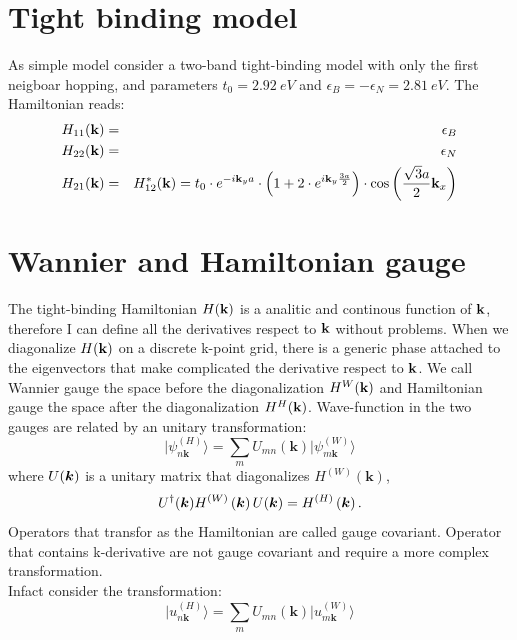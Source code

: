 \documentclass[preprint,showpacs,prb,superscriptaddress,aps,floatfix]{revtex4-1}
\newcommand{\kk}{{\bf k}}
\newcommand{\bea}{\begin{eqnarray}}
\newcommand{\eea}{\end{eqnarray}}
\renewcommand{\[}{\left[}
\renewcommand{\]}{\right]}
\renewcommand{\(}{\left(}
\renewcommand{\)}{\right)}
\def\ket#1{\vert#1\rangle}
\begin{document}
\section{Tight binding model}
As simple model consider a two-band tight-binding model with only the first neigboar hopping, and parameters $t_0=2.92~eV$ and $\epsilon_B = -\epsilon_N = 2.81~eV$. The Hamiltonian reads:
\bea
H_{11}(\kk)&=&\epsilon_B\\
H_{22}(\kk)&=&\epsilon_N\\
H_{21}(\kk)&=&H^*_{12}(\kk) = t_0 \cdot e^{-i \kk_y a}\cdot \left(1+2 \cdot e^{i \kk_y \frac{3 a}{2}} \right)\cdot \cos{ \left( \frac{\sqrt{3} a}{2}\kk_x \right) }
\eea 
\section{Wannier and Hamiltonian gauge}
The tight-binding Hamiltonian $H(\kk)$ is a analitic and continous function of $\kk$, therefore I can define all the derivatives respect to $\kk$ without problems. When we diagonalize $H(\kk)$ on a discrete k-point grid, there is a generic phase attached to the eigenvectors that make complicated the derivative respect to $\kk$. We call Wannier gauge the space before the diagonalization  $H^{W}(\kk)$ and Hamiltonian gauge the space after the diagonalization $H^{H}(\kk)$. Wave-function in the two gauges are related by an unitary transformation:
\begin{equation}
\ket{\psi_{n\boldsymbol{k}}^{\left(H\right)}}=\sum_{m}U_{mn}\left(\boldsymbol{k}\right)\ket{\psi_{m\boldsymbol{k}}^{\left(W\right)}}
\end{equation}
where $U\text{\ensuremath{\left(\boldsymbol{k}\right)}}$ is a unitary
matrix that diagonalizes $H^{(W)}\left(\boldsymbol{k}\right)$,
\begin{equation}
U^{\dagger}\text{\ensuremath{\left(\boldsymbol{k}\right)}}H^{(W)}\left(\boldsymbol{k}\right)U\text{\ensuremath{\left(\boldsymbol{k}\right)}}=H^{(H)}\left(\boldsymbol{k}\right).
\end{equation}
Operators that transfor as the Hamiltonian are called gauge covariant. Operator that contains k-derivative are not gauge covariant and require a more complex transformation.\\
Infact consider the transformation:
\begin{equation}
\ket{u_{n\boldsymbol{k}}^{\left(H\right)}}=\sum_{m}U_{mn}\left(\boldsymbol{k}\right)\ket{u_{m\boldsymbol{k}}^{\left(W\right)}}
	\label{u_transf}
\end{equation}
\end{document}
